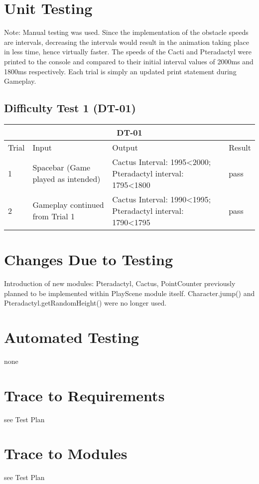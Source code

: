 \documentclass[12pt, titlepage]{article}
\begin{document}
\section{Unit Testing}
Note: Manual testing was used. Since the implementation of the obstacle speeds are intervals, decreasing the intervals would result in the animation taking place in less time, hence virtually faster. The speeds of the Cacti and Pteradactyl were printed to the console and compared to their initial interval values of 2000ms and 1800ms respectively. Each trial is simply an updated print statement during Gameplay.
\subsection{Difficulty Test 1 (DT-01)}
\begin{tabular}{ |p{3cm}||p{3cm}|p{3cm}|p{3cm}|  }
 \hline
 \multicolumn{4}{|c|}{DT-01} \\
 \hline
Trial & Input & Output & Result\\
 \hline
1 & Spacebar (Game played as intended) & Cactus Interval: 1995<2000; Pteradactyl interval: 1795<1800 &  pass\\
\midrule
2 & Gameplay continued from Trial 1 & Cactus Interval: 1990<1995; Pteradactyl interval: 1790<1795 & pass\\
 \hline
\end{tabular}

\section{Changes Due to Testing}
Introduction of new modules: Pteradactyl, Cactus, PointCounter previously planned to be implemented within PlayScene module itself. Character.jump() and Pteradactyl.getRandomHeight() were no longer used.

\section{Automated Testing}
none
		
\section{Trace to Requirements}
see Test Plan
		
\section{Trace to Modules}
see Test Plan		
\end{document}
